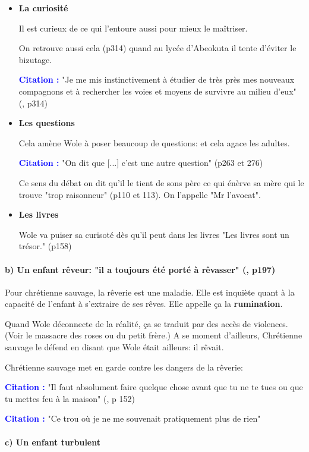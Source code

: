 \documentclass[a4paper, 11pt, hidelinks]{article}
\newcommand{\cit}{\large \textcolor{blue}{\textbf{Citation :}} \large }
\newcommand{\rb}[1]{\Romanbar{#1}}
\begin{document}
\begin{itemize}
    \item \textbf{La curiosité}

          Il est curieux de ce qui l'entoure aussi pour mieux le maîtriser.

          On retrouve aussi cela (p314) quand au lycée d'Abeokuta il tente d'éviter le bizutage.

          \cit "Je me mis instinctivement à étudier de très près mes nouveaux compagnons et à rechercher les voies et moyens de survivre au milieu d'eux" (\rb{12}, p314)
    \item \textbf{Les questions}

          Cela amène Wole à poser beaucoup de questions: et cela agace les adultes.

          \cit "On dit que [...] c'est une autre question" (p263 et 276)

          Ce sens du débat on dit qu'il le tient de sons père ce qui énèrve sa mère qui le trouve "trop raisonneur" (p110 et 113). On l'appelle "Mr l'avocat".

    \item \textbf{Les livres}

          Wole va puiser sa curisoté dès qu'il peut dans les livres "Les livres sont un trésor." (p158)
\end{itemize}

\paragraph{b) Un enfant rêveur: "il a toujours été porté à rêvasser" (\rb{7}, p197)}


Pour chrétienne sauvage, la rêverie est une maladie. Elle est inquiète quant à la capacité de l'enfant à s'extraire de ses rêves.
Elle appelle ça la \textbf{rumination}.

Quand Wole déconnecte de la réalité, ça se traduit par des accès de violences. (Voir le massacre des roses ou du petit frère.)
A se moment d'ailleurs, Chrétienne sauvage le défend en disant que Wole était ailleurs: il rêvait.


Chrétienne sauvage met en garde contre les dangers de la rêverie:

\cit "Il faut absolument faire quelque chose avant que tu ne te tues ou que tu mettes feu à la maison" (\rb{5}, p 152)


\cit "Ce trou où je ne me souvenait pratiquement plus de rien"

\paragraph{c) Un enfant turbulent}
\end{document}
